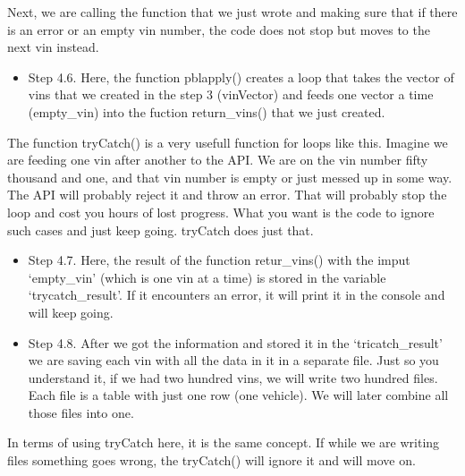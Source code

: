 \documentclass[]{book}
\providecommand{\tightlist}{%
  \setlength{\itemsep}{0pt}\setlength{\parskip}{0pt}}
\begin{document}
Next, we are calling the function that we just wrote and making sure that if there is an error or an empty vin number, the code does not stop but moves to the next vin instead.

\begin{itemize}
\tightlist
\item
  Step 4.6. Here, the function pblapply() creates a loop that takes the vector of vins that we created in the step 3 (vinVector) and feeds one vector a time (empty\_vin) into the fuction return\_vins() that we just created.
\end{itemize}

The function tryCatch() is a very usefull function for loops like this. Imagine we are feeding one vin after another to the API. We are on the vin number fifty thousand and one, and that vin number is empty or just messed up in some way. The API will probably reject it and throw an error. That will probably stop the loop and cost you hours of lost progress. What you want is the code to ignore such cases and just keep going. tryCatch does just that.

\begin{itemize}
\item
  Step 4.7. Here, the result of the function retur\_vins() with the imput `empty\_vin' (which is one vin at a time) is stored in the variable `trycatch\_result'. If it encounters an error, it will print it in the console and will keep going.
\item
  Step 4.8. After we got the information and stored it in the `tricatch\_result' we are saving each vin with all the data in it in a separate file. Just so you understand it, if we had two hundred vins, we will write two hundred files. Each file is a table with just one row (one vehicle). We will later combine all those files into one.
\end{itemize}

In terms of using tryCatch here, it is the same concept. If while we are writing files something goes wrong, the tryCatch() will ignore it and will move on.
\end{document}
